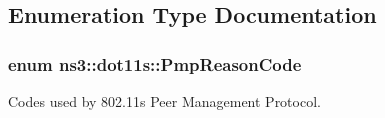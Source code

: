 \subsection{Enumeration Type Documentation}
\subsubsection[{\texorpdfstring{Pmp\+Reason\+Code}{PmpReasonCode}}]{\setlength{\rightskip}{0pt plus 5cm}enum {\bf ns3\+::dot11s\+::\+Pmp\+Reason\+Code}}\hypertarget{group__dot11s_ga1132ec5975c87960ceb86ea54481aba6}{}\label{group__dot11s_ga1132ec5975c87960ceb86ea54481aba6}


Codes used by 802.\+11s Peer Management Protocol. 


